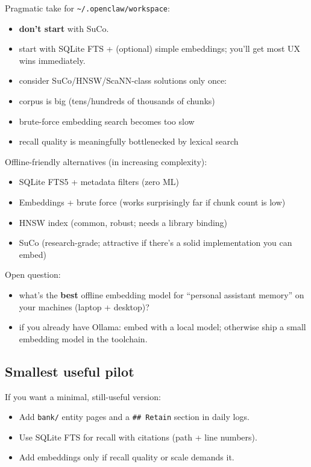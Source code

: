 Pragmatic take for \texttt{\textasciitilde{}/.openclaw/workspace}:

\begin{itemize}
  \item \textbf{don’t start} with SuCo.
  \item start with SQLite FTS + (optional) simple embeddings; you’ll get most UX wins immediately.
  \item consider SuCo/HNSW/ScaNN-class solutions only once:
  \item corpus is big (tens/hundreds of thousands of chunks)
  \item brute-force embedding search becomes too slow
  \item recall quality is meaningfully bottlenecked by lexical search
\end{itemize}


Offline-friendly alternatives (in increasing complexity):

\begin{itemize}
  \item SQLite FTS5 + metadata filters (zero ML)
  \item Embeddings + brute force (works surprisingly far if chunk count is low)
  \item HNSW index (common, robust; needs a library binding)
  \item SuCo (research-grade; attractive if there’s a solid implementation you can embed)
\end{itemize}


Open question:

\begin{itemize}
  \item what’s the \textbf{best} offline embedding model for “personal assistant memory” on your machines (laptop + desktop)?
  \item if you already have Ollama: embed with a local model; otherwise ship a small embedding model in the toolchain.
\end{itemize}


\subsection{Smallest useful pilot}


If you want a minimal, still-useful version:

\begin{itemize}
  \item Add \texttt{bank/} entity pages and a \texttt{\#\# Retain} section in daily logs.
  \item Use SQLite FTS for recall with citations (path + line numbers).
  \item Add embeddings only if recall quality or scale demands it.
\end{itemize}


